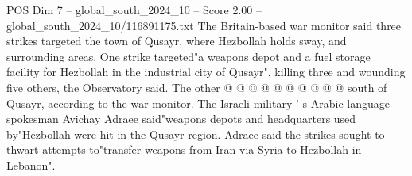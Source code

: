 \begin{textsample}{POS Dim 7 – global\_south\_2024\_10 – Score 2.00 – global\_south\_2024\_10/116891175.txt}
The Britain-based war monitor said three strikes targeted the town of Qusayr, where Hezbollah holds sway, and surrounding areas.
One strike targeted"a weapons depot and a fuel storage facility for Hezbollah in the industrial city of Qusayr", killing three and wounding five others, the Observatory said.
The other @ @ @ @ @ @ @ @ @ @ south of Qusayr, according to the war monitor.
The Israeli military ' s Arabic-language spokesman Avichay Adraee said"weapons depots and headquarters used by"Hezbollah were hit in the Qusayr region.
Adraee said the strikes sought to thwart attempts to"transfer weapons from Iran via Syria to Hezbollah in Lebanon".

\end{textsample}
